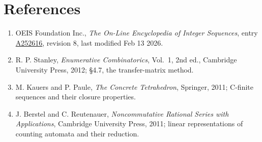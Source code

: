 \documentclass[11pt]{article}
\theoremstyle{definition}
\begin{document}
\section{References}

\begin{enumerate}

\item OEIS Foundation Inc., \emph{The On-Line Encyclopedia of Integer Sequences}, entry \href{https://oeis.org/A252616}{A252616}, revision 8, last modified Feb 13 2026.

\item R. P. Stanley, \emph{Enumerative Combinatorics}, Vol.~1, 2nd ed., Cambridge University Press, 2012; \S4.7, the transfer-matrix method.

\item M. Kauers and P. Paule, \emph{The Concrete Tetrahedron}, Springer, 2011; C-finite sequences and their closure properties.

\item J. Berstel and C. Reutenauer, \emph{Noncommutative Rational Series with Applications}, Cambridge University Press, 2011; linear representations of counting automata and their reduction.

\end{enumerate}
\end{document}
